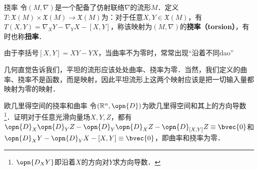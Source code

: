 \begin{definition}{挠率}
令$(M, \nabla)$是一个配备了仿射联络$\nabla$的流形$M$．定义$T:\mathfrak{X}(M)\times\mathfrak{X}(M)\to\mathfrak{X}(M)$为：对于任意$X, Y\in\mathfrak{X}(M)$，有$T(X, Y)=\nabla_XY-\nabla_YX-{[X, Y]}$，称该映射为$(M, \nabla)$的\textbf{挠率（torsion）}，有时也称\textbf{扭率}．
\end{definition}

由于李括号$[X, Y]=XY-YX$，当曲率不为零时，常常出现“沿着不同dao”

几何直觉告诉我们，平坦的流形应该处处曲率、挠率为零．当然，我们定义的曲率、挠率不是函数，而是映射，因此平坦流形上这两个映射应该是把一切输入量都映射为零的映射．

\begin{exercise}{欧几里得空间的挠率和曲率}
令$(\mathbb{R}^n, \opn{D})$为欧几里得空间和其上的方向导数\footnote{$\opn{D_XY}$即沿着$X$的方向对$Y$求方向导数．}．证明对于任意光滑向量场$X, Y, Z$，都有$\opn{D}_X\opn{D}_YZ-\opn{D}_Y\opn{D}_XZ-\opn{D}_{[X, Y]}Z\equiv\bvec{0}$和$\opn{D}_XY-\opn{D}_YX-{[X, Y]}\equiv\bvec{0}$，即曲率和挠率为零．
\end{exercise}



